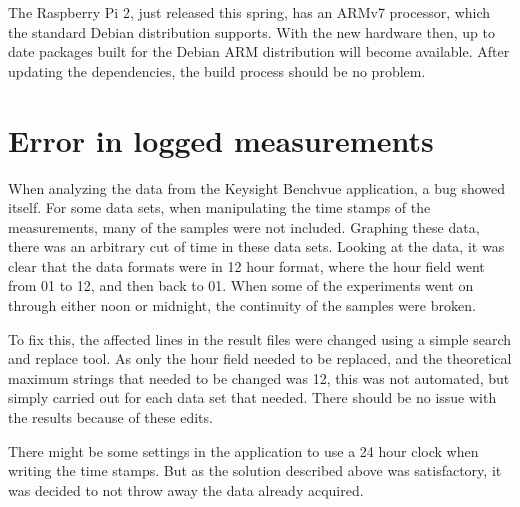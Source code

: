 The Raspberry Pi 2, just released this spring, has an ARMv7 processor, which the standard Debian distribution supports.
With the new hardware then, up to date packages built for the Debian ARM distribution will become available. 
After updating the dependencies, the build process should be no problem.

\section{Error in logged measurements}
When analyzing the data from the Keysight Benchvue application, a bug showed itself.
For some data sets, when manipulating the time stamps of the measurements, many of the samples were not included.
Graphing these data, there was an arbitrary cut of time in these data sets.
Looking at the data, it was clear that the data formats were in 12 hour format, where the hour field went from 01 to 12, and then back to 01.
When some of the experiments went on through either noon or midnight, the continuity of the samples were broken.

To fix this, the affected lines in the result files were changed using a simple search and replace tool.
As only the hour field needed to be replaced, and the theoretical maximum strings that needed to be changed was 12, this was not automated, but simply carried out for each data set that needed.
There should be no issue with the results because of these edits.

There might be some settings in the application to use a 24 hour clock when writing the time stamps.
But as the solution described above was satisfactory, it was decided to not throw away the data already acquired.
